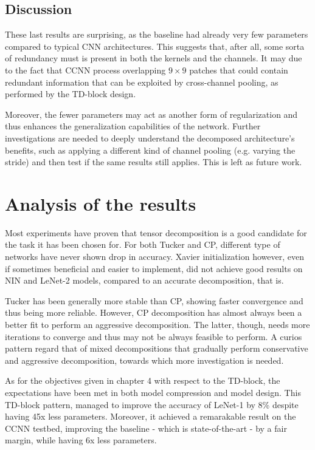 \subsection{Discussion}
These last results are surprising, as the baseline had already very few parameters compared to typical CNN architectures. This suggests that, after all, some sorta of redundancy must is present in both the kernels and the channels. It may due to the fact that CCNN process overlapping $9 \times 9$ patches that could contain redundant information that can be exploited by cross-channel pooling, as performed by the TD-block design. 

Moreover, the fewer parameters may act as another form of regularization and thus enhances the generalization capabilities of the network. Further investigations are needed to deeply understand the decomposed architecture's benefits, such as applying a different kind of channel pooling (e.g. varying the stride) and then test if the same results still applies. This is left as future work. 



\section{Analysis of the results}
Most experiments have proven that tensor decomposition is a good candidate for the task it has been chosen for. For both Tucker and CP, different type of networks have never shown drop in accuracy. Xavier initialization however, even if sometimes beneficial and easier to implement, did not achieve good results on NIN and LeNet-2 models, compared to an accurate decomposition, that is. 
\newline

Tucker has been generally more stable than CP, showing faster convergence and thus being more reliable. However, CP decomposition has almost always been a better fit to perform an aggressive decomposition. The latter, though, needs more iterations to converge and thus may not be always feasible to perform. A curios pattern regard that of mixed decompositions that gradually perform conservative and aggressive decomposition, towards which more investigation is needed. 
\newline 

As for the objectives given in chapter 4 with respect to the TD-block, the expectations have been met in both model compression and model design. This TD-block pattern, managed to improve the accuracy of LeNet-1 by 8\% despite having 45x less parameters. Moreover, it achieved a remarakable result on the CCNN testbed, improving the baseline - which is state-of-the-art - by a fair margin, while having 6x less parameters. 



